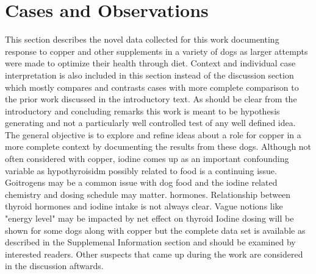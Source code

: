\newcommand{\mjmhersheytext}{
Hershey quickly demonstrated several problems not long after arrival.
He had problems with his fur, digestion, and coughing while ultimately
being diagnosed with heart failure and bladder stones.
As many initial features could be rationalized as related to thyroid output,
his iodine intake was elevated. 
During his time here, his diet was varied and he was observed
for overall eating and behavior with specific interest in 
coughing and ability to make it up a short flight of steps
from the backyard to the deck. As has often been the case, the notes 
were not sufficient
to fully capture the dynamics of his condition but some representative
ones have been edited into the above list. Some correspondence with
copper intake is noted. In the last few days of his life, he
would pass out and quickly regain consciousness until one day 
he did not recover presumably due to heart failure. 
In retropsect, his initial response to increased copper may have been
to be more energetic but that increased his coughing leading
to a dosage reduction. The time scale analysis for various conditions that
may relate to copper deficiency is consistent with this idea making
the prognosis for coughing reduction and increased energy good with continued
copper and maybe other nutrients.  
Clearly the data are incomplete but suggestive
now of some benefits. 

} %






\section{Cases and Observations}

This section describes the 
novel data collected for this work documenting
response to copper and other supplements in a variety of dogs
as larger attempts were made to optimize their health through diet.
Context and individual case interpretation is also included in this section
 instead of the
discussion section which mostly compares and contrasts  
cases with more complete comparison to the prior work discussed
in the introductory text.  
As should be clear from the introductory and concluding remarks
this work is meant to be hypothesis generating and not a particularly
well controlled test of any well defined idea.  The general objective
is to explore and refine ideas about a role for copper in a more
complete context by documenting the results from these dogs. 
Although not often considered with copper, iodine comes up as
an important confounding variable as hypothyroisidm possibly
related to food is a continuing issue. 
Goitrogens may be a common issue with dog food and the iodine related
chemistry and dosing schedule may matter.
hormones. 
Relationship between thyroid hormones and iodine intake
is not always clear. 
Vague notions like "energy level" may be impacted by net effect on thyroid
Iodine dosing will be shown for some dogs
along with copper but the complete data set is available
as described in the Supplemenal Information section and should
be examined by interested readers. 
Other suspects that came up during the work are  considered in the
discussion aftwards.   




